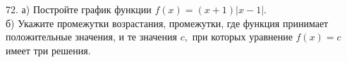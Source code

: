 72. а) Постройте график функции $f(x)=(x+1)|x-1|.$\\
б) Укажите промежутки возрастания, промежутки, где функция принимает положительные значения, и те значения $c,$ при которых уравнение $f(x)=c$ имеет три решения.\\
